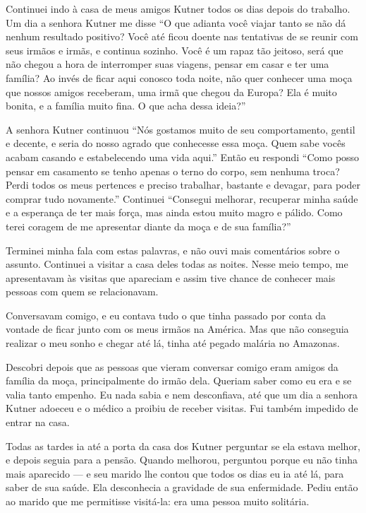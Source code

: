 Continuei indo à casa de meus amigos Kutner todos os dias depois do
trabalho. Um dia a senhora Kutner me disse ``O que adianta você viajar
tanto se não dá nenhum resultado positivo? Você até ficou doente
nas tentativas de se reunir com seus irmãos e irmãs, e continua
sozinho. Você é um rapaz tão jeitoso, será que não chegou a hora de interromper 
suas viagens, pensar em casar e ter uma família? Ao invés de ficar
aqui conosco toda noite, não quer conhecer uma moça que nossos amigos
receberam, uma irmã que chegou da Europa? Ela é muito bonita, e a família
muito fina. O que acha dessa ideia?''

A senhora Kutner continuou ``Nós gostamos muito de seu comportamento,
gentil e decente, e seria do nosso agrado que conhecesse essa moça.
Quem sabe vocês acabam casando e estabelecendo uma vida aqui.'' Então
eu respondi ``Como posso pensar em casamento se tenho apenas o
terno do corpo, sem nenhuma troca? Perdi todos os
meus pertences e preciso trabalhar, bastante e devagar, para poder comprar tudo novamente.'' Continuei ``Consegui melhorar, recuperar minha saúde e a esperança de ter mais força, mas ainda estou muito magro e
pálido. Como terei coragem de me apresentar diante da moça e de sua
família?''

Terminei minha fala com estas palavras, e não ouvi mais comentários sobre o assunto. 
Continuei a visitar a casa deles todas as
noites. Nesse meio tempo, me apresentavam às visitas que apareciam e assim
tive chance de conhecer mais pessoas com quem se relacionavam.

Conversavam comigo, e eu contava tudo o que tinha passado por conta da
vontade de ficar junto com os meus irmãos na América. Mas que não 
conseguia realizar o meu sonho e chegar até lá, tinha até 
pegado malária no Amazonas.

Descobri depois que as pessoas que vieram conversar comigo eram
amigos da família da moça, principalmente do irmão dela. Queriam saber
como eu era e se valia tanto empenho. Eu nada sabia e nem
desconfiava, até que um dia a senhora Kutner adoeceu e o médico a proibiu
de receber visitas. Fui também impedido de entrar na casa.

Todas as tardes ia até a porta da casa dos Kutner perguntar se ela
estava melhor, e depois seguia para a pensão. Quando melhorou, perguntou
porque eu não tinha mais aparecido --- e seu marido lhe contou que todos os
dias eu ia até lá, para saber de sua saúde. Ela desconhecia a 
gravidade de sua enfermidade. Pediu então ao marido que me permitisse visitá-la: era 
uma pessoa muito solitária.


